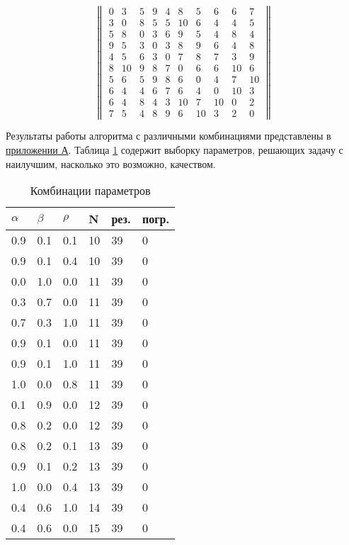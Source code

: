 \begin{equation}\label{math:class1}
	\begin{Vmatrix}
		0 & 3  & 5  & 9  & 4  & 8  & 5  & 6  & 6  & 7  \\
		3 & 0  & 8  & 5  & 5  & 10 & 6  & 4  & 4  & 5  \\
		5 & 8  & 0  & 3  & 6  & 9  & 5  & 4  & 8  & 4  \\
		9 & 5  & 3  & 0  & 3  & 8  & 9  & 6  & 4  & 8  \\
		4 & 5  & 6  & 3  & 0  & 7  & 8  & 7  & 3  & 9  \\
		8 & 10 & 9  & 8  & 7  & 0  & 6  & 6  & 10 & 6  \\
		5 & 6  & 5  & 9  & 8  & 6  & 0  & 4  & 7  & 10 \\
		6 & 4  & 4  & 6  & 7  & 6  & 4  & 0  & 10 & 3  \\
		6 & 4  & 8  & 4  & 3  & 10 & 7  & 10 & 0  & 2  \\
		7 & 5  & 4  & 8  & 9  & 6  & 10 & 3  & 2  & 0  
	\end{Vmatrix} 
\end{equation}

Результаты работы алгоритма с различными комбинациями представлены в \hyperref[sec:fig1]{приложении А}. Таблица \ref{tab:class1} содержит выборку параметров, решающих задачу с наилучшим, насколько это возможно, качеством.

\begin{table}[H]
\centering
	\caption{Комбинации параметров}
	\renewcommand{\arraystretch}{1.15}
	\begin{tabular}{||p{}p{}p{}p{}p{}p{}||}
		\hline
		$\alpha$ & $\beta$ & $\rho$ & N & рез. & погр. \\ \hline\hline
		0.9 & 0.1 & 0.1 & 10 & 39 & 0 \\ 
		0.9 & 0.1 & 0.4 & 10 & 39 & 0 \\ 
		0.0 & 1.0 & 0.0 & 11 & 39 & 0 \\ 
		0.3 & 0.7 & 0.0 & 11 & 39 & 0 \\ 
		0.7 & 0.3 & 1.0 & 11 & 39 & 0 \\ 
		0.9 & 0.1 & 0.0 & 11 & 39 & 0 \\ 
		0.9 & 0.1 & 1.0 & 11 & 39 & 0 \\ 
		1.0 & 0.0 & 0.8 & 11 & 39 & 0 \\ 
		0.1 & 0.9 & 0.0 & 12 & 39 & 0 \\ 
		0.8 & 0.2 & 0.0 & 12 & 39 & 0 \\ 
		0.8 & 0.2 & 0.1 & 13 & 39 & 0 \\ 
		0.9 & 0.1 & 0.2 & 13 & 39 & 0 \\ 
		1.0 & 0.0 & 0.4 & 13 & 39 & 0 \\ 
		0.4 & 0.6 & 1.0 & 14 & 39 & 0 \\ 
		0.4 & 0.6 & 0.0 & 15 & 39 & 0 \\ 
		\hline
	\end{tabular}
\label{tab:class1}
\end{table}

